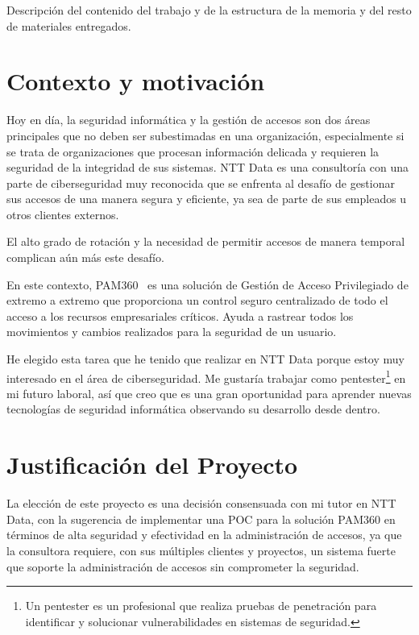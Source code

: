 
Descripción del contenido del trabajo y de la estructura de la memoria y del resto de materiales entregados.

\section{Contexto y motivación}
Hoy en día, la seguridad informática y la gestión de accesos son dos áreas principales que no deben ser subestimadas en una organización, especialmente si se trata de organizaciones que procesan información delicada y requieren la seguridad de la integridad de sus sistemas. NTT Data es una consultoría con una parte de ciberseguridad muy reconocida que se enfrenta al desafío de gestionar sus accesos de una manera segura y eficiente, ya sea de parte de sus empleados u otros clientes externos.

El alto grado de rotación y la necesidad de permitir accesos de manera temporal complican aún más este desafío.

En este contexto, PAM360~\cite{manageengine2023pam360} es una solución de Gestión de Acceso Privilegiado de extremo a extremo que proporciona un control seguro centralizado de todo el acceso a los recursos empresariales críticos. Ayuda a rastrear todos los movimientos y cambios realizados para la seguridad de un usuario.

He elegido esta tarea que he tenido que realizar en NTT Data porque estoy muy interesado en el área de ciberseguridad. Me gustaría trabajar como pentester\footnote{Un pentester es un profesional que realiza pruebas de penetración para identificar y solucionar vulnerabilidades en sistemas de seguridad.} en mi futuro laboral, así que creo que es una gran oportunidad para aprender nuevas tecnologías de seguridad informática observando su desarrollo desde dentro.




\section{Justificación del Proyecto}
La elección de este proyecto es una decisión consensuada con mi tutor en NTT Data, con la sugerencia de implementar una POC para la solución PAM360 en términos de alta seguridad y efectividad en la administración de accesos, ya que la consultora requiere, con sus múltiples clientes y proyectos, un sistema fuerte que soporte la administración de accesos sin comprometer la seguridad.

